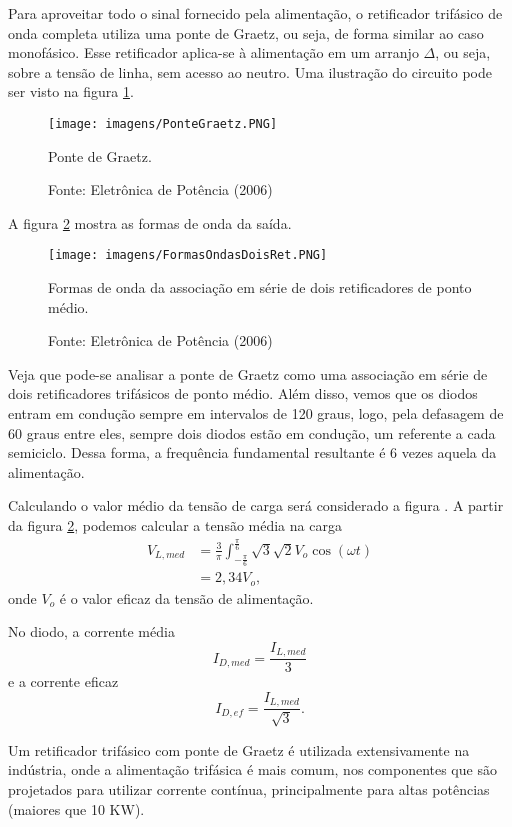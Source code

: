 Para aproveitar todo o sinal fornecido pela alimentação, o retificador trifásico de onda completa utiliza uma ponte de Graetz, ou seja, de forma similar ao caso monofásico. Esse retificador aplica-se à alimentação em um arranjo $\Delta$, ou seja, sobre a tensão de linha, sem acesso ao neutro. Uma ilustração do circuito pode ser visto na figura \ref{fig:PGz}.

\begin{figure}[ht]
    \center
    \texttt{[image: imagens/PonteGraetz.PNG]}
    \caption{Ponte de Graetz.}\label{fig:PGz}
    \caption*{Fonte: Eletrônica de Potência (2006)}
\end{figure}

A figura \ref{fig:FOASDRPM} mostra as formas de onda da saída.

\begin{figure}[ht]
    \center
    \texttt{[image: imagens/FormasOndasDoisRet.PNG]}
    \caption{Formas de onda da associação em série de dois retificadores de ponto médio.}\label{fig:FOASDRPM}
    \caption*{Fonte: Eletrônica de Potência (2006)}
\end{figure}

Veja que pode-se analisar a ponte de Graetz como uma associação em série de dois retificadores trifásicos de ponto médio. Além disso, vemos que os diodos entram em condução sempre em intervalos de 120 graus, logo, pela defasagem de 60 graus entre eles, sempre dois diodos estão em condução, um referente a cada semiciclo. Dessa forma, a frequência fundamental resultante é 6 vezes aquela da alimentação.

Calculando o valor médio da tensão de carga será considerado a figura .
A partir da figura \ref{fig:FOASDRPM}, podemos calcular a tensão média na carga
\begin{align*}
V_{L,med} &= \frac{3}{\pi}{\int_{-\frac{\pi}{6}}^{\frac{\pi}{6}}}{\sqrt{3}{\sqrt{2}}{V_o}}\cos(\omega{t}) \\
&= 2,34 V_o
,\end{align*} 
onde $V_o$ é o valor eficaz da tensão de alimentação.

No diodo, a corrente média \[
    I_{D,med} = \frac{I_{L,med}}{3}
\] e a corrente eficaz \[
    I_{D,ef} = \frac{I_{L,med}}{\sqrt{3}}
.\]

Um retificador trifásico com ponte de Graetz é utilizada extensivamente na indústria, onde a alimentação trifásica é mais comum, nos componentes que são projetados para utilizar corrente contínua, principalmente para altas potências (maiores que 10 KW).

